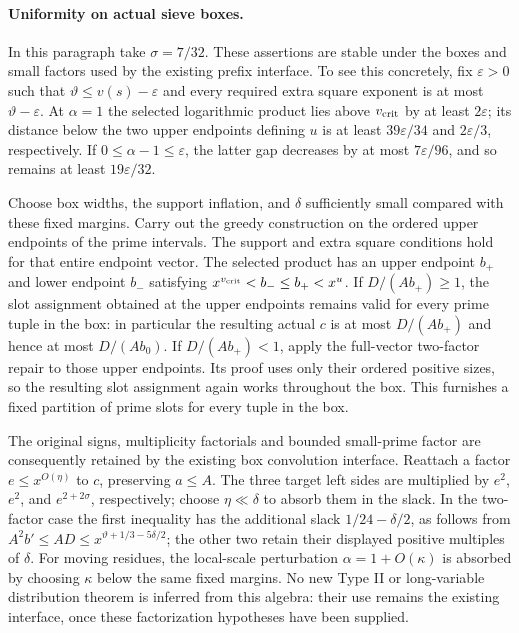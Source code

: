 \documentclass[11pt]{article}
\begin{document}
\paragraph{Uniformity on actual sieve boxes.}
In this paragraph take $\sigma=7/32$.
These assertions are stable under the boxes and small factors used
by the existing prefix interface.  To see this concretely, fix
$\varepsilon>0$ such that $\vartheta\le v(s)-\varepsilon$ and every
required extra square exponent is at most $\vartheta-\varepsilon$.
At $\alpha=1$ the selected logarithmic product lies above
$v_{\rm crit}$ by at least $2\varepsilon$; its distance below the two
upper endpoints defining $u$ is at least $39\varepsilon/34$ and
$2\varepsilon/3$, respectively.  If $0\le\alpha-1\le\varepsilon$,
the latter gap decreases by at most $7\varepsilon/96$, and so remains
at least $19\varepsilon/32$.

Choose box widths, the support inflation, and $\delta$ sufficiently
small compared with these fixed margins.  Carry out the greedy
construction on the ordered upper endpoints of the prime intervals.
The support and extra square conditions hold for that entire endpoint
vector.  The selected product has an upper endpoint $b_+$ and lower
endpoint $b_-$ satisfying $x^{v_{\rm crit}}<b_-\le b_+<x^u$.
If $D/(A b_+)\ge1$, the slot assignment obtained at the upper
endpoints remains valid for every prime tuple in the box: in
particular the resulting actual $c$ is at most $D/(A b_+)$ and hence
at most $D/(A b_0)$.  If $D/(A b_+)<1$, apply the full-vector
two-factor repair to those upper endpoints.  Its proof uses only
their ordered positive sizes, so the resulting slot assignment again
works throughout the box.  This furnishes a fixed partition of prime
slots for every tuple in the box.

The original signs, multiplicity factorials and bounded small-prime
factor are consequently retained by the existing box convolution
interface.  Reattach a factor $e\le x^{O(\eta)}$ to $c$, preserving $a\le A$.
The three target left sides are multiplied by $e^2$, $e^2$, and
$e^{2+2\sigma}$, respectively; choose $\eta\ll\delta$ to absorb them
in the slack.  In the two-factor case the first inequality has the
additional slack $1/24-\delta/2$, as follows from
$A^2b'\le AD\le x^{\vartheta+1/3-5\delta/2}$;
the other two retain their displayed positive multiples of $\delta$.  For moving residues, the local-scale perturbation
$\alpha=1+O(\kappa)$ is absorbed by choosing $\kappa$ below the same
fixed margins.  No new Type II or long-variable distribution theorem
is inferred from this algebra: their use remains the existing
interface, once these factorization hypotheses have been supplied.
\end{document}
